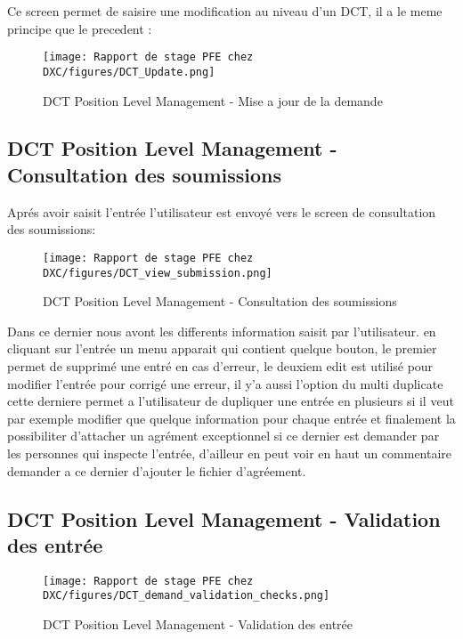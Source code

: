 Ce screen permet de saisire une modification au niveau d'un DCT, il a le meme principe que le precedent : 

\begin{figure}[H]
    \centering
    \texttt{[image: Rapport de stage PFE chez DXC/figures/DCT\_Update.png]}
    \caption{DCT Position Level Management - Mise a jour de la demande}
\end{figure}

\subsection{DCT Position Level Management - Consultation des soumissions}

Aprés avoir saisit l'entrée l'utilisateur est envoyé vers le screen de consultation des soumissions:


\begin{figure}[H]
    \centering
    \texttt{[image: Rapport de stage PFE chez DXC/figures/DCT\_view\_submission.png]}
    \caption{DCT Position Level Management - Consultation des soumissions}
\end{figure}

Dans ce dernier nous avont les differents information saisit par l'utilisateur. en cliquant sur l'entrée un menu apparait qui contient quelque bouton, le premier permet de supprimé une entré en cas d'erreur, le deuxiem edit est utilisé pour modifier l'entrée pour corrigé une erreur, il y'a aussi l'option du multi duplicate cette derniere permet a l'utilisateur de dupliquer une entrée en plusieurs si il veut par exemple modifier que quelque information pour chaque entrée et finalement la possibiliter d'attacher un agrément exceptionnel si ce dernier est demander par les personnes qui inspecte l'entrée, d'ailleur en peut voir en haut un commentaire demander a ce dernier d'ajouter le fichier d'agréement.

\subsection{DCT Position Level Management - Validation des entrée}

\begin{figure}[H]
    \centering
    \texttt{[image: Rapport de stage PFE chez DXC/figures/DCT\_demand\_validation\_checks.png]}
    \caption{DCT Position Level Management - Validation des entrée}
\end{figure}